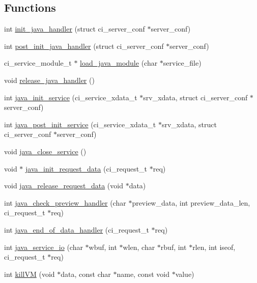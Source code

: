 \subsection*{Functions}
\begin{DoxyCompactItemize}
\item 
int \hyperlink{c-icap-java_8c_a8608028d6507eaa054dbfdda13263da9}{init\+\_\+java\+\_\+handler} (struct ci\+\_\+server\+\_\+conf $\ast$server\+\_\+conf)
\item 
int \hyperlink{c-icap-java_8c_a472cf4c2c9280417823c49e3919bbf9b}{post\+\_\+init\+\_\+java\+\_\+handler} (struct ci\+\_\+server\+\_\+conf $\ast$server\+\_\+conf)
\item 
ci\+\_\+service\+\_\+module\+\_\+t $\ast$ \hyperlink{c-icap-java_8c_ac0e05d829e840acc75d0980ae4a51bd5}{load\+\_\+java\+\_\+module} (char $\ast$service\+\_\+file)
\item 
void \hyperlink{c-icap-java_8c_a92dca6f4495d51ed83d22cbd9d96d143}{release\+\_\+java\+\_\+handler} ()
\item 
int \hyperlink{c-icap-java_8c_a09348decf68c68ed0e477f4ead7d758f}{java\+\_\+init\+\_\+service} (ci\+\_\+service\+\_\+xdata\+\_\+t $\ast$srv\+\_\+xdata, struct ci\+\_\+server\+\_\+conf $\ast$server\+\_\+conf)
\item 
int \hyperlink{c-icap-java_8c_a45697ae9db4c5c4e3c5573fc0add243a}{java\+\_\+post\+\_\+init\+\_\+service} (ci\+\_\+service\+\_\+xdata\+\_\+t $\ast$srv\+\_\+xdata, struct ci\+\_\+server\+\_\+conf $\ast$server\+\_\+conf)
\item 
void \hyperlink{c-icap-java_8c_a6e0dd60d19e7bcafde11ee9fb4c81d4c}{java\+\_\+close\+\_\+service} ()
\item 
void $\ast$ \hyperlink{c-icap-java_8c_aa8e4298bbc55ca26285ae6d809d04757}{java\+\_\+init\+\_\+request\+\_\+data} (ci\+\_\+request\+\_\+t $\ast$req)
\item 
void \hyperlink{c-icap-java_8c_a757cc7a55bf2ec3cb4720e757ac18005}{java\+\_\+release\+\_\+request\+\_\+data} (void $\ast$data)
\item 
int \hyperlink{c-icap-java_8c_aab52a5dff6e8d20196700fe42bb32d16}{java\+\_\+check\+\_\+preview\+\_\+handler} (char $\ast$preview\+\_\+data, int preview\+\_\+data\+\_\+len, ci\+\_\+request\+\_\+t $\ast$req)
\item 
int \hyperlink{c-icap-java_8c_a7ba64ed6445f034ba77bec0dffee7bc7}{java\+\_\+end\+\_\+of\+\_\+data\+\_\+handler} (ci\+\_\+request\+\_\+t $\ast$req)
\item 
int \hyperlink{c-icap-java_8c_aad97b7706dcf8f8548285de4f9cba49a}{java\+\_\+service\+\_\+io} (char $\ast$wbuf, int $\ast$wlen, char $\ast$rbuf, int $\ast$rlen, int iseof, ci\+\_\+request\+\_\+t $\ast$req)
\item 
int \hyperlink{c-icap-java_8c_a2de36ee3aca6f4adfb39b1b77ae64025}{kill\+V\+M} (void $\ast$data, const char $\ast$name, const void $\ast$value)
\end{DoxyCompactItemize}
